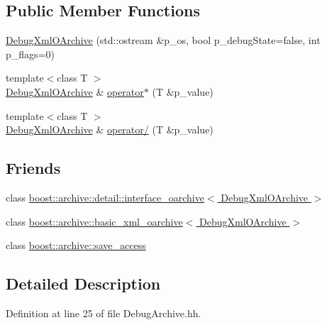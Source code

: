 \subsection*{Public Member Functions}
\begin{DoxyCompactItemize}
\item 
\hyperlink{classxtd_1_1serializer_1_1DebugXmlOArchive_aff4ee095fcc036756c7326731a15e9b7}{Debug\-Xml\-O\-Archive} (std\-::ostream \&p\-\_\-os, bool p\-\_\-debug\-State=false, int p\-\_\-flags=0)
\item 
{\footnotesize template$<$class T $>$ }\\\hyperlink{classxtd_1_1serializer_1_1DebugXmlOArchive}{Debug\-Xml\-O\-Archive} \& \hyperlink{classxtd_1_1serializer_1_1DebugXmlOArchive_a537495d2f70d2553edf308bafd0a6327}{operator$\ast$} (T \&p\-\_\-value)
\item 
{\footnotesize template$<$class T $>$ }\\\hyperlink{classxtd_1_1serializer_1_1DebugXmlOArchive}{Debug\-Xml\-O\-Archive} \& \hyperlink{classxtd_1_1serializer_1_1DebugXmlOArchive_a8e0706fca2bb1dd85556b537db740baf}{operator/} (T \&p\-\_\-value)
\end{DoxyCompactItemize}
\subsection*{Friends}
\begin{DoxyCompactItemize}
\item 
class \hyperlink{classxtd_1_1serializer_1_1DebugXmlOArchive_ade7e327f8089db178808693b17013b37}{boost\-::archive\-::detail\-::interface\-\_\-oarchive$<$ Debug\-Xml\-O\-Archive $>$}
\item 
class \hyperlink{classxtd_1_1serializer_1_1DebugXmlOArchive_ae9a53f0a6d08579fd714365dec459e66}{boost\-::archive\-::basic\-\_\-xml\-\_\-oarchive$<$ Debug\-Xml\-O\-Archive $>$}
\item 
class \hyperlink{classxtd_1_1serializer_1_1DebugXmlOArchive_aaca003bb8a4fc59424e4025130da4edd}{boost\-::archive\-::save\-\_\-access}
\end{DoxyCompactItemize}


\subsection{Detailed Description}


Definition at line 25 of file Debug\-Archive.\-hh.



